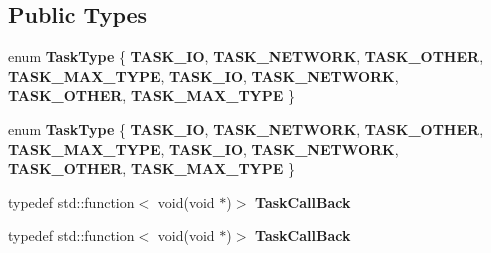\subsection*{Public Types}
\begin{DoxyCompactItemize}
\item 
\mbox{\label{classAsyncTaskPool_a6534ed22a4d2490911c713d44b194d99}} 
enum {\bfseries Task\+Type} \{ \newline
{\bfseries T\+A\+S\+K\+\_\+\+IO}, 
{\bfseries T\+A\+S\+K\+\_\+\+N\+E\+T\+W\+O\+RK}, 
{\bfseries T\+A\+S\+K\+\_\+\+O\+T\+H\+ER}, 
{\bfseries T\+A\+S\+K\+\_\+\+M\+A\+X\+\_\+\+T\+Y\+PE}, 
\newline
{\bfseries T\+A\+S\+K\+\_\+\+IO}, 
{\bfseries T\+A\+S\+K\+\_\+\+N\+E\+T\+W\+O\+RK}, 
{\bfseries T\+A\+S\+K\+\_\+\+O\+T\+H\+ER}, 
{\bfseries T\+A\+S\+K\+\_\+\+M\+A\+X\+\_\+\+T\+Y\+PE}
 \}
\item 
\mbox{\label{classAsyncTaskPool_a6534ed22a4d2490911c713d44b194d99}} 
enum {\bfseries Task\+Type} \{ \newline
{\bfseries T\+A\+S\+K\+\_\+\+IO}, 
{\bfseries T\+A\+S\+K\+\_\+\+N\+E\+T\+W\+O\+RK}, 
{\bfseries T\+A\+S\+K\+\_\+\+O\+T\+H\+ER}, 
{\bfseries T\+A\+S\+K\+\_\+\+M\+A\+X\+\_\+\+T\+Y\+PE}, 
\newline
{\bfseries T\+A\+S\+K\+\_\+\+IO}, 
{\bfseries T\+A\+S\+K\+\_\+\+N\+E\+T\+W\+O\+RK}, 
{\bfseries T\+A\+S\+K\+\_\+\+O\+T\+H\+ER}, 
{\bfseries T\+A\+S\+K\+\_\+\+M\+A\+X\+\_\+\+T\+Y\+PE}
 \}
\item 
\mbox{\label{classAsyncTaskPool_a6136bd45583ec63ca47bf43ceb8dbcf8}} 
typedef std\+::function$<$ void(void $\ast$)$>$ {\bfseries Task\+Call\+Back}
\item 
\mbox{\label{classAsyncTaskPool_a6136bd45583ec63ca47bf43ceb8dbcf8}} 
typedef std\+::function$<$ void(void $\ast$)$>$ {\bfseries Task\+Call\+Back}
\end{DoxyCompactItemize}
